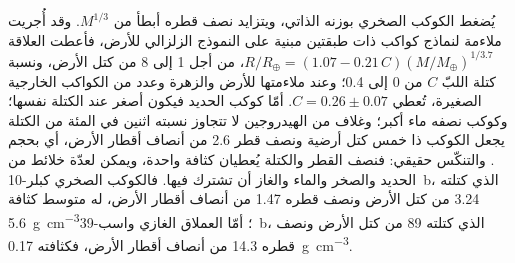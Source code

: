 يُضغط الكوكب الصخري بوزنه الذاتي، ويتزايد نصف قطره
أبطأ من $M^{1/3}$. وقد أُجريت ملاءمة لنماذج كواكب ذات طبقتين مبنية على
النموذج الزلزالي للأرض، فأعطت العلاقة $R/R_\oplus = (1.07 - 0.21\,C)
(M/M_\oplus)^{1/3.7}$، من أجل 1 إلى 8 من كتل الأرض، ونسبة كتلة اللبّ
$C$ من 0 إلى 0.4؛ وعند ملاءمتها للأرض والزهرة وعدد من الكواكب الخارجية
الصغيرة، تُعطي $C = 0.26 \pm 0.07$. أمّا
كوكب الحديد فيكون أصغر عند الكتلة نفسها؛ وكوكب نصفه ماء أكبر؛
وغلاف من الهيدروجين لا تتجاوز نسبته اثنين في المئة من الكتلة يجعل الكوكب ذا
خمس كتل أرضية ونصف قطر \num{2.6} من أنصاف أقطار الأرض، أي بحجم
. والتنكّس حقيقي: فنصف القطر والكتلة يُعطيان كثافة واحدة، ويمكن
لعدّة خلائط من الحديد والصخر والماء والغاز أن تشترك فيها.
فالكوكب الصخري كبلر-10~b، الذي كتلته 3.24 من كتل الأرض ونصف قطره 1.47 من أنصاف أقطار الأرض،
له متوسط كثافة \qty{5.6}{g.cm^{-3}}؛ أمّا العملاق الغازي واسب-39~b،
الذي كتلته 89 من كتل الأرض ونصف قطره 14.3 من أنصاف أقطار الأرض، فكثافته \qty{0.17}{g.cm^{-3}}.

